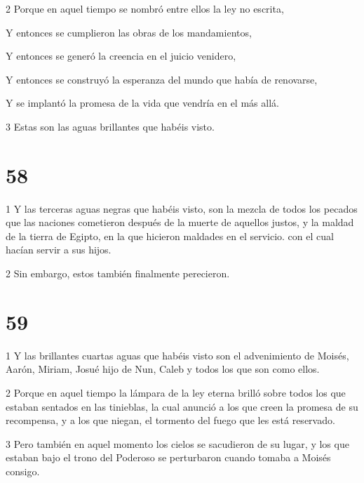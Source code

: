 \par 2 Porque en aquel tiempo se nombró entre ellos la ley no escrita,

\par Y entonces se cumplieron las obras de los mandamientos,

\par Y entonces se generó la creencia en el juicio venidero,

\par Y entonces se construyó la esperanza del mundo que había de renovarse,

\par Y se implantó la promesa de la vida que vendría en el más allá.

\par 3 Estas son las aguas brillantes que habéis visto.

\chapter{58}

\par 1 Y las terceras aguas negras que habéis visto, son la mezcla de todos los pecados que las naciones cometieron después de la muerte de aquellos justos, y la maldad de la tierra de Egipto, en la que hicieron maldades en el servicio. con el cual hacían servir a sus hijos.

\par 2 Sin embargo, estos también finalmente perecieron.

\chapter{59}

\par 1 Y las brillantes cuartas aguas que habéis visto son el advenimiento de Moisés, Aarón, Miriam, Josué hijo de Nun, Caleb y todos los que son como ellos.

\par 2 Porque en aquel tiempo la lámpara de la ley eterna brilló sobre todos los que estaban sentados en las tinieblas, la cual anunció a los que creen la promesa de su recompensa, y a los que niegan, el tormento del fuego que les está reservado.

\par 3 Pero también en aquel momento los cielos se sacudieron de su lugar, y los que estaban bajo el trono del Poderoso se perturbaron cuando tomaba a Moisés consigo.

